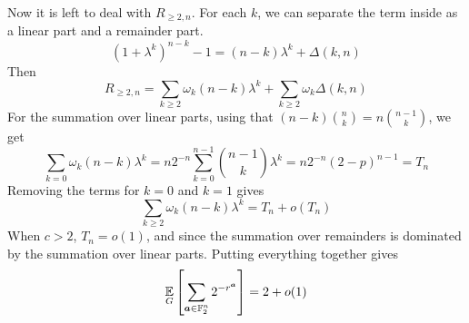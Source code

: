 \documentclass[10pt, twocolumn, a4paper]{article}
\theoremstyle{plain}
\theoremstyle{definition}
\theoremstyle{remark}
\begin{document}
Now it is left to deal with $R_{\ge2,n}$. For each $k$, we can separate the term inside as a linear part and a remainder part. \begin{equation}
(1+\lambda^k)^{n-k} - 1 = (n-k)\lambda^k + \Delta(k,n)
\end{equation}
Then \begin{equation}
    R_{\ge2,n} = \sum_{k\geq 2} \omega_k (n-k)\lambda^k + \sum_{k\geq 2} \omega_k\Delta(k,n)
\end{equation}
For the summation over linear parts, using that $(n-k)\binom{n}{k} = n \binom{n-1}{k}$, we get 
\begin{equation}
    \sum_{k=0} \omega_k (n-k)\lambda^k = n2^{-n} \sum_{k=0}^{n-1} \binom{n-1}{k} \lambda^k = n2^{-n}(2-p)^{n-1} = T_n
\end{equation}
Removing the terms for $k=0$ and $k=1$ gives
\begin{equation}
    \sum_{k\geq 2} \omega_k (n-k)\lambda^k = T_n + o(T_n)
\end{equation}
When $c>2$, $T_n = o(1)$, and since the summation over remainders is dominated by the summation over linear parts. Putting everything together gives
\begin{equation}
    \operatorname*{\mathbb{E}}_G\left[\sum_{{\bm{a}} \in \mathbb{F}_2^n}  2^{-r^{\bm{a}}}\right] = 2 + o(1)
\end{equation}
\end{document}
